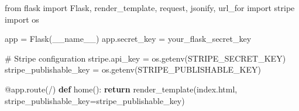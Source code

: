 \documentclass[
  letterpaper,
  DIV=11,
  numbers=noendperiod]{scrreprt}
\newenvironment{Shaded}{\begin{snugshade}}{\end{snugshade}}
\newcommand{\AttributeTok}[1]{\textcolor[rgb]{0.40,0.45,0.13}{#1}}
\newcommand{\CommentTok}[1]{\textcolor[rgb]{0.37,0.37,0.37}{#1}}
\newcommand{\ControlFlowTok}[1]{\textcolor[rgb]{0.00,0.23,0.31}{\textbf{#1}}}
\newcommand{\ImportTok}[1]{\textcolor[rgb]{0.00,0.46,0.62}{#1}}
\newcommand{\KeywordTok}[1]{\textcolor[rgb]{0.00,0.23,0.31}{\textbf{#1}}}
\newcommand{\NormalTok}[1]{\textcolor[rgb]{0.00,0.23,0.31}{#1}}
\newcommand{\OperatorTok}[1]{\textcolor[rgb]{0.37,0.37,0.37}{#1}}
\newcommand{\StringTok}[1]{\textcolor[rgb]{0.13,0.47,0.30}{#1}}
\newcommand{\VariableTok}[1]{\textcolor[rgb]{0.07,0.07,0.07}{#1}}
\begin{document}
\begin{Shaded}
\begin{Highlighting}[]
\ImportTok{from}\NormalTok{ flask }\ImportTok{import}\NormalTok{ Flask, render\_template, request, jsonify, url\_for}
\ImportTok{import}\NormalTok{ stripe}
\ImportTok{import}\NormalTok{ os}

\NormalTok{app }\OperatorTok{=}\NormalTok{ Flask(}\VariableTok{\_\_name\_\_}\NormalTok{)}
\NormalTok{app.secret\_key }\OperatorTok{=} \StringTok{\textquotesingle{}your\_flask\_secret\_key\textquotesingle{}}

\CommentTok{\# Stripe configuration}
\NormalTok{stripe.api\_key }\OperatorTok{=}\NormalTok{ os.getenv(}\StringTok{\textquotesingle{}STRIPE\_SECRET\_KEY\textquotesingle{}}\NormalTok{)}
\NormalTok{stripe\_publishable\_key }\OperatorTok{=}\NormalTok{ os.getenv(}\StringTok{\textquotesingle{}STRIPE\_PUBLISHABLE\_KEY\textquotesingle{}}\NormalTok{)}

\AttributeTok{@app.route}\NormalTok{(}\StringTok{\textquotesingle{}/\textquotesingle{}}\NormalTok{)}
\KeywordTok{def}\NormalTok{ home():}
    \ControlFlowTok{return}\NormalTok{ render\_template(}\StringTok{\textquotesingle{}index.html\textquotesingle{}}\NormalTok{, stripe\_publishable\_key}\OperatorTok{=}\NormalTok{stripe\_publishable\_key)}


\end{Highlighting}
\end{Shaded}
\end{document}
